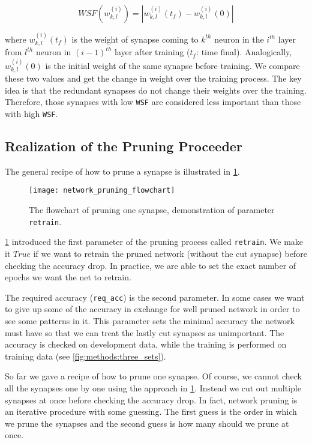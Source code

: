 \begin{equation} \label{eq:weight_significance_factor}
WSF(w_{k,l}^{(i)}) = | w_{k,l}^{(i)} (t_f) - w_{k,l}^{(i)} (0) |
\end{equation}

where $ w_{k,l}^{(i)} (t_f) $ is the weight of synapse coming to $ k^{th} $ neuron in the $ i^{th} $ layer from $ l^{th} $ neuron in $ (i-1)^{th} $ layer after training ($ t_f $: time final). Analogically, $ w_{k,l}^{(i)} (0) $ is the initial weight of the same synapse before training. We compare these two values and get the change in weight over the training process. The key idea is that the redundant synapses do not change their weights over the training. Therefore, those synapses with low \texttt{WSF} are considered less important than those with high \texttt{WSF}.

\subsection*{Realization of the Pruning Proceeder}
The general recipe of how to prune a synapse is illustrated in \cref{fig:methods:network_pruning_flowchart}.

\begin{figure}[H]
  \centering
  \texttt{[image: network\_pruning\_flowchart]}
  \caption{The flowchart of pruning one synapse, demonstration of parameter \texttt{retrain}.}
  \label{fig:methods:network_pruning_flowchart}
\end{figure}

\cref{fig:methods:network_pruning_flowchart} introduced the first parameter of the pruning process called \texttt{retrain}. We make it $ True $ if we want to retrain the pruned network (without the cut synapse) before checking the accuracy drop. In practice, we are able to set the exact number of epochs we want the net to retrain.

The required accuracy (\texttt{req\_acc}) is the second parameter. In some cases we want to give up some of the accuracy in exchange for well pruned network in order to see some patterns in it. This parameter sets the minimal accuracy the network must have so that we can treat the lastly cut synapses as unimportant. The accuracy is checked on development data, while the training is performed on training data (see \cref{fig:methods:three_sets}).

So far we gave a recipe of how to prune one synapse. Of course, we cannot check all the synapses one by one using the approach in \cref{fig:methods:network_pruning_flowchart}. Instead we cut out multiple synapses at once before checking the accuracy drop. In fact, network pruning is an iterative procedure with some guessing. The first guess is the order in which we prune the synapses and the second guess is how many should we prune at once.

